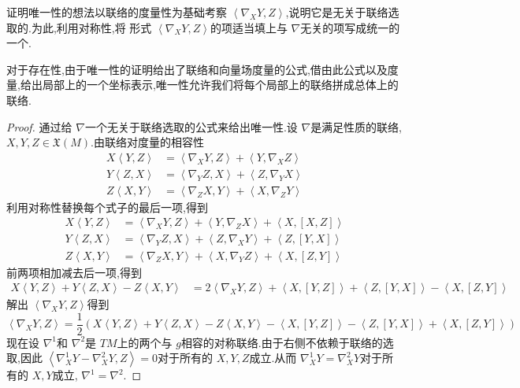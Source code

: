 \documentclass[../../几何与拓扑.tex]{subfiles}
\begin{document}
\begin{note}
    证明唯一性的想法以联络的度量性为基础考察 \(  \left< \nabla _{X}Y,Z \right>  \),说明它是无关于联络选取的.为此,利用对称性,将 形式 \(  \left< \nabla _{X}Y,Z \right>  \)的项适当填上与 \(   \nabla   \)无关的项写成统一的一个.

    对于存在性,由于唯一性的证明给出了联络和向量场度量的公式,借由此公式以及度量,给出局部上的一个坐标表示,唯一性允许我们将每个局部上的联络拼成总体上的联络.
\end{note}
\begin{proof}
    通过给 \(   \nabla   \)一个无关于联络选取的公式来给出唯一性.设 \(   \nabla   \)是满足性质的联络, \(  X,Y,Z \in \mathfrak{X}\left( M \right)   \).由联络对度量的相容性 \[
    \begin{aligned}
    X\left<Y,Z \right> &=  \left< \nabla _{X}Y,Z \right>+ \left<Y, \nabla _{X}Z \right> \\ 
     Y\left<Z,X \right>& =  \left< \nabla _{Y}Z,X \right>+ \left<Z, \nabla _{Y}X \right>\\ 
      Z\left<X,Y \right>& =  \left< \nabla _{Z}X,Y \right>+ \left<X, \nabla _{Z}Y \right>  
    \end{aligned}
    \]   利用对称性替换每个式子的最后一项,得到 \[
    \begin{aligned}
    X\left<Y,Z \right>&= \left< \nabla _{X}Y,Z \right>+ \left<Y, \nabla _{Z}X \right>+ \left<X,[X,Z] \right>\\ 
     Y\left<Z,X \right>& =\left< \nabla _{Y}Z,X \right>+ \left<Z, \nabla _{X}Y \right>+ \left<Z,\left[ Y,X \right]  \right>\\ 
          Z\left<X,Y \right>& =  \left< \nabla _{Z}X,Y \right>+ \left<X, \nabla _{Y}Z \right> + \left<X,\left[ Z,Y \right]  \right>
    \end{aligned}
    \]前两项相加减去后一项,得到 \[
    \begin{aligned}
    X\left<Y,Z \right>+ Y\left<Z,X \right>-Z\left<X,Y \right>& = 2\left< \nabla _{X}Y,Z \right> + \left<X,\left[ Y,Z \right]  \right>+ \left<Z,\left[ Y,X \right]  \right>-\left<X,\left[ Z,Y \right]  \right>
    \end{aligned}
    \]解出 \(  \left< \nabla _{X}Y,Z \right>  \)得到 \[
    \left< \nabla _{X}Y,Z \right>= \frac{1}{2}\left( X\left<Y,Z \right>+ Y\left<Z,X \right>-Z\left<X,Y \right>-\left<X,\left[ Y,Z \right]  \right> -\left<Z,\left[ Y,X \right]\right>+ \left<X,\left[ Z,Y \right]  \right>  \right) 
    \] 现在设 \(   \nabla ^{1}  \)和 \(   \nabla ^{2}  \)是 \(  TM  \)上的两个与 \(  g  \)相容的对称联络.由于右侧不依赖于联络的选取,因此 \(  \left< \nabla _{X}^{1}Y- \nabla _{X}^{2}Y,Z \right>= 0  \)对于所有的 \(  X,Y,Z  \)成立.从而 \(   \nabla _{X}^{1}Y=  \nabla _{X}^{2}Y  \)对于所有的 \(  X,Y  \)成立, \(   \nabla ^{1}=  \nabla ^{2}  \).         



\end{proof}
\end{document}
